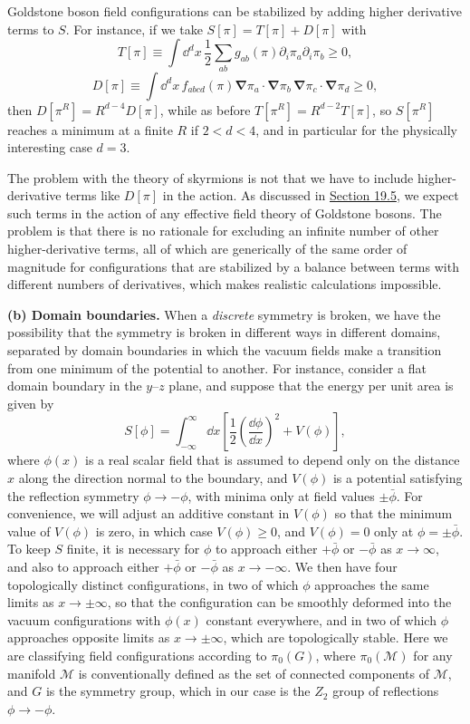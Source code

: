 Goldstone boson field configurations can be stabilized by adding higher
derivative terms to $S$. For instance, if we take
$S[\pi]=T[\pi]+D[\pi]$ with
\[
 T[\pi]\equiv\int \dd^d x\,\frac{1}{2}\sum_{ab}g_{ab}(\pi)
 \partial_i\pi_a\partial_i\pi_b\geq0,
\]
\[
 D[\pi]\equiv\int \dd^d x\,f_{abcd}(\pi)
 \boldsymbol{\nabla}\pi_a\cdot\boldsymbol{\nabla}\pi_b\,
 \boldsymbol{\nabla}\pi_c\cdot\boldsymbol{\nabla}\pi_d\geq0,
\]
then $D[\pi^R]=R^{d-4}D[\pi]$, while as before
$T[\pi^R]=R^{d-2}T[\pi]$, so $S[\pi^R]$ reaches a minimum at a finite $R$
if $2<d<4$, and in particular for the physically interesting case $d=3$.

The problem with the theory of skyrmions is not that we have to include
higher-derivative terms like $D[\pi]$ in the action. As discussed in
\hyperref[sec:19.5]{Section 19.5}, we expect such terms in the action of any
effective field theory of Goldstone bosons. The problem is that there is no
rationale for excluding an infinite number of other higher-derivative
terms, all of which are generically of the same order of magnitude for
configurations that are stabilized by a balance between terms with
different numbers of derivatives, which makes realistic calculations
impossible.

\noindent\textbf{(b) Domain boundaries.} When a \emph{discrete} symmetry is
broken, we have the possibility that the symmetry is broken in different
ways in different domains, separated by domain boundaries in which the
vacuum fields make a transition from one minimum of the potential to
another. For instance, consider a flat domain boundary in the $y$--$z$
plane, and suppose that the energy per unit area is given by
\begin{equation}
 S[\phi]=\int_{-\infty}^{\infty}\dd x\left[
  \frac{1}{2}\left(\frac{\dd\phi}{\dd x}\right)^2+V(\phi)
 \right],
 \tag{23.1.2}\label{eq:23.1.2}
\end{equation}
where $\phi(x)$ is a real scalar field that is assumed to depend only on the
distance $x$ along the direction normal to the boundary, and $V(\phi)$ is a
potential satisfying the reflection symmetry $\phi\to-\phi$, with minima
only at field values $\pm\bar\phi$. For convenience, we will adjust an
additive constant in $V(\phi)$ so that the minimum value of $V(\phi)$ is
zero, in which case $V(\phi)\geq0$, and $V(\phi)=0$ only at
$\phi=\pm\bar\phi$. To keep $S$ finite, it is necessary for $\phi$ to
approach either $+\bar\phi$ or $-\bar\phi$ as $x\to\infty$, and also to
approach either $+\bar\phi$ or $-\bar\phi$ as $x\to-\infty$. We then have
four topologically distinct configurations, in two of which $\phi$
approaches the same limits as $x\to\pm\infty$, so that the configuration
can be smoothly deformed into the vacuum configurations with $\phi(x)$
constant everywhere, and in two of which $\phi$ approaches opposite limits
as $x\to\pm\infty$, which are topologically stable. Here we are classifying
field configurations according to $\pi_0(G)$, where $\pi_0(\mathcal M)$ for
any manifold $\mathcal M$ is conventionally defined as the set of connected
components of $\mathcal M$, and $G$ is the symmetry group, which in our case
is the $Z_2$ group of reflections $\phi\to-\phi$.

